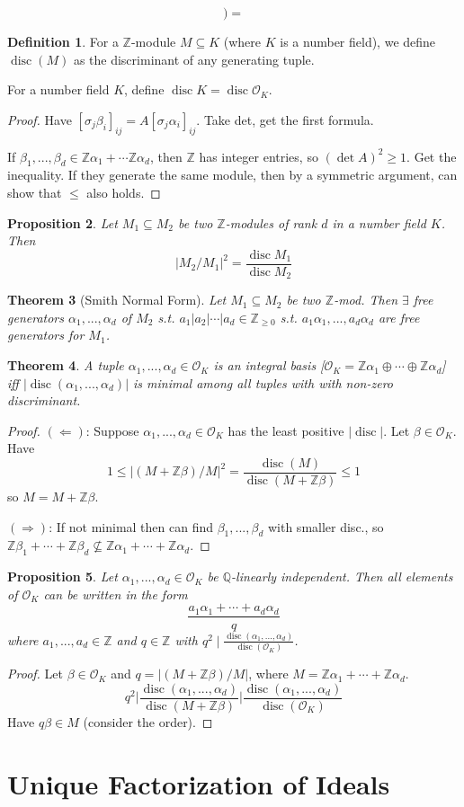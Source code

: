 \documentclass{article}
\theoremstyle{definition}
\newtheorem{defn}{Definition}[section]
\theoremstyle{remark}
\theoremstyle{plain}
\newtheorem{thm}[defn]{Theorem}
\newtheorem{prop}[defn]{Proposition}
\newcommand{\ZZ}{\mathbb{Z}}
\newcommand{\QQ}{\mathbb{Q}}
\newcommand{\disc}{\operatorname{disc}}
\begin{document}
\[)=\tag{Owen's Signature}\]
\begin{defn}
    For a $\ZZ$-module $M\subseteq K$ (where $K$ is a number field), we define $\disc(M)$ as the discriminant of any generating tuple.

    For a number field $K$, define $\disc K=\disc\mathcal O_K$.
\end{defn}
\begin{proof}
    Have $[\sigma_j{\beta_i}]_{ij}=A[\sigma_j\alpha_i]_{ij}$. Take det, get the first formula.

    If $\beta_1,...,\beta_d\in\ZZ\alpha_1+\cdots\ZZ\alpha_d$, then $\ZZ$ has integer entries, so $(\det A)^2\geqslant 1$. Get the inequality. If they generate the same module, then by a symmetric argument, can show that $\le$ also holds.
\end{proof}
\begin{prop}
    Let $M_1\subseteq M_2$ be two $\ZZ$-modules of rank $d$ in a number field $K$. Then 
    \[|M_2/M_1|^2=\dfrac{\disc M_1}{\disc M_2}\]
\end{prop}
\begin{thm}[Smith Normal Form]
    Let $M_1\subseteq M_2$ be two $\ZZ$-mod. Then $\exists$ free generators $\alpha_1,...,\alpha_d$ of $M_2$ s.t. $a_1|a_2|\cdots|a_d\in\ZZ_{\ge 0}$ s.t. $a_1\alpha_1,...,a_d\alpha_d$ are free generators for $M_1$.
\end{thm}
\begin{thm}
    A tuple $\alpha_1,...,\alpha_d\in\mathcal O_K$ is an integral basis [$\mathcal O_K=\ZZ\alpha_1\oplus\cdots\oplus\ZZ\alpha_d$] iff $|\disc(\alpha_1,...,\alpha_d)|$ is minimal among all tuples with with non-zero discriminant.
\end{thm}
\begin{proof}
    $(\Leftarrow)$: Suppose $\alpha_1,...,\alpha_d\in\mathcal O_K$ has the least positive $|\disc|$. Let $\beta\in\mathcal O_K$. Have
    \[1\le |(M+\ZZ\beta)/M|^2=\dfrac{\disc(M)}{\disc(M+\ZZ\beta)}\le1\]
    so $M=M+\ZZ\beta$.

    $(\Rightarrow)$: If not minimal then can find $\beta_1,...,\beta_d$ with smaller disc., so $\ZZ\beta_1+\cdots+\ZZ\beta_d\nsubseteq\ZZ\alpha_1+\cdots+\ZZ\alpha_d$.
\end{proof}
\begin{prop}
    Let $\alpha_1,...,\alpha_d\in\mathcal O_K$ be $\QQ$-linearly independent. Then all elements of $\mathcal O_K$ can be written in the form
    \[\dfrac{a_1\alpha_1+\cdots+a_d\alpha_d}{q}\]
    where $a_1,...,a_d\in\ZZ$ and $q\in\ZZ$ with $q^2\mid \frac{\disc(\alpha_1,...,\alpha_d)}{\disc(\mathcal O_K)}$.
\end{prop}
\begin{proof}
    Let $\beta\in\mathcal O_K$ and $q=|(M+\ZZ\beta)/M|$, where $M=\ZZ\alpha_1+\cdots+\ZZ\alpha_d$.
    \[q^2\Bigg|\frac{\disc(\alpha_1,...,\alpha_d)}{\disc(M+\ZZ\beta)}\Bigg|\frac{\disc(\alpha_1,...,\alpha_d)}{\disc(\mathcal O_K)}\]
    Have $q\beta\in M$ (consider the order).
\end{proof}
\section{Unique Factorization of Ideals}
\end{document}
